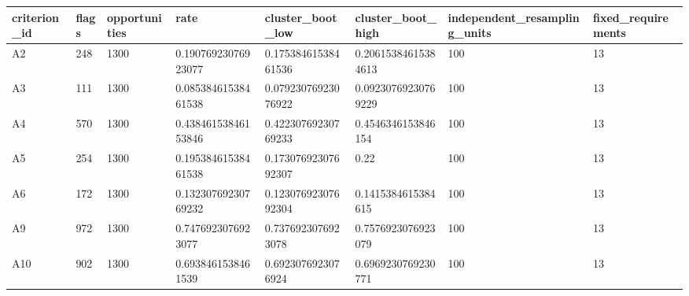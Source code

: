 \begin{tabular}{llllllll}
\hline
criterion\_id & flags & opportunities & rate & cluster\_boot\_low & cluster\_boot\_high & independent\_resampling\_units & fixed\_requirements \\
\hline
A2 & 248 & 1300 & 0.19076923076923077 & 0.17538461538461536 & 0.20615384615384613 & 100 & 13 \\
A3 & 111 & 1300 & 0.08538461538461538 & 0.07923076923076922 & 0.09230769230769229 & 100 & 13 \\
A4 & 570 & 1300 & 0.43846153846153846 & 0.42230769230769233 & 0.4546346153846154 & 100 & 13 \\
A5 & 254 & 1300 & 0.19538461538461538 & 0.17307692307692307 & 0.22 & 100 & 13 \\
A6 & 172 & 1300 & 0.13230769230769232 & 0.12307692307692304 & 0.1415384615384615 & 100 & 13 \\
A9 & 972 & 1300 & 0.7476923076923077 & 0.7376923076923078 & 0.7576923076923079 & 100 & 13 \\
A10 & 902 & 1300 & 0.6938461538461539 & 0.6923076923076924 & 0.6969230769230771 & 100 & 13 \\
\hline
\end{tabular}